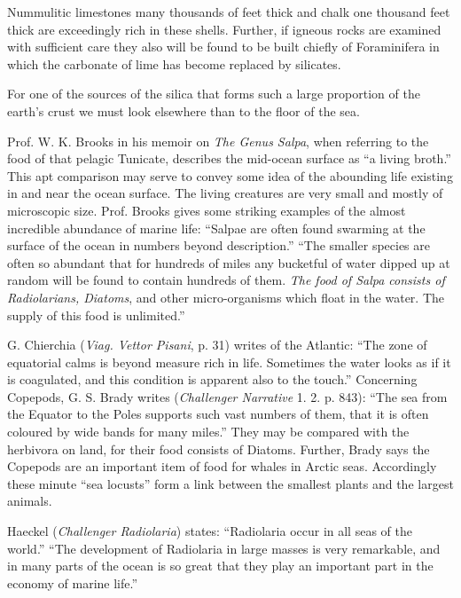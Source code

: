 \documentclass[a4paper, 12pt, oneside, landscape]{article}
\begin{document}
Nummulitic limestones many thousands of feet thick and chalk one thousand feet thick are exceedingly rich in these shells. Further, if igneous rocks are examined with sufficient care they also will be found to be built chiefly of Foraminifera in which the carbonate of lime has become replaced by silicates.

For one of the sources of the silica that forms such a large proportion of the earth's crust we must look elsewhere than to the floor of the sea.

Prof. W. K. Brooks in his memoir on \emph{The Genus Salpa}, when referring to the food of that pelagic Tunicate, describes the mid-ocean surface as ``a living broth.'' This apt comparison may serve to convey some idea of the abounding life existing in and near the ocean surface. The living creatures are very small and mostly of microscopic size. Prof. Brooks gives some striking examples of the almost incredible abundance of marine life: ``Salpae are often found swarming at the surface of the ocean in numbers beyond description.'' ``The smaller species are often so abundant that for hundreds of miles any bucketful of water dipped up at random will be found to contain hundreds of them. \emph{The food of Salpa consists of Radiolarians, Diatoms}, and other micro-organisms which float in the water. The supply of this food is unlimited.'' 

G. Chierchia (\emph{Viag. Vettor Pisani}, p. 31) writes of the Atlantic: ``The zone of equatorial calms is beyond measure rich in life. Sometimes the water looks as if it is coagulated, and this condition is apparent also to the touch.'' Concerning Copepods, G. S. Brady writes (\emph{Challenger Narrative} 1. 2. p. 843): ``The sea from the Equator to the Poles supports such vast numbers of them, that it is often coloured by wide bands for many miles.'' They may be compared with the herbivora on land, for their food consists of Diatoms. Further, Brady says the Copepods are an important item of food for whales in Arctic seas. Accordingly these minute ``sea locusts'' form a link between the smallest plants and the largest animals. 

Haeckel (\emph{Challenger Radiolaria}) states: ``Radiolaria occur in all seas of the world.'' ``The development of Radiolaria in large masses is very remarkable, and in many parts of the ocean is so great that they play an important part in the economy of marine life.'' 
\end{document}
